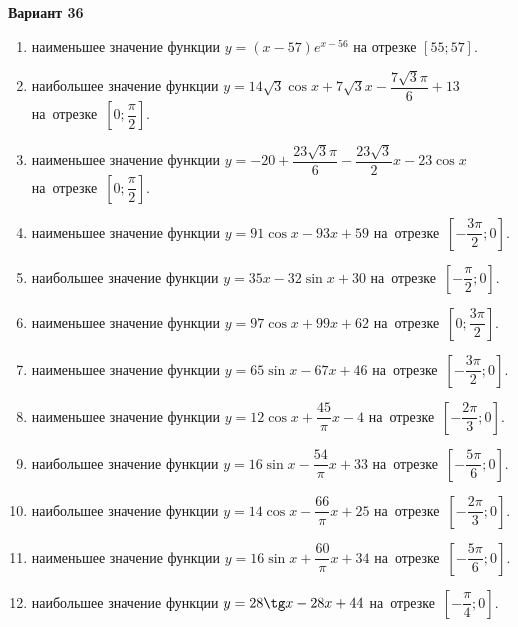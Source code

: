 \documentclass[a4paper,10pt]{article}
\begin{document}
\begin{center}\Large\textbf{Вариант 36}\end{center}

\begin{enumerate}
\item {} наименьшее значение функции $y = \left(x-57\right)e^{x-56}$ на отрезке $\left[55;57\right]$.

\item {} наибольшее значение функции $y = 14\sqrt{3}\cos x+7\sqrt{3}x-\dfrac{7\sqrt{3}\pi}{6} +13$ на~отрезке~$\left[0;\dfrac{\pi }{2}\right]$.

\item {} наименьшее значение функции $y = -20+\dfrac{23\sqrt{3} \pi}{6}-\dfrac{23\sqrt{3}}{2}x-23\cos x$ на~отрезке~$\left[0;\dfrac{\pi }{2}\right]$.

\item {} наименьшее значение функции $y = 91\cos x-93x+59$ на~отрезке~$\left[-\dfrac{3\pi }{2};0\right]$.

\item {} наибольшее значение функции $y = 35x-32\sin x+30$ на~отрезке~$\left[-\dfrac{\pi }{2};0\right]$.

\item {} наименьшее значение функции $y = 97\cos x+99x+62$ на~отрезке~$\left[0;\dfrac{3\pi }{2}\right]$.

\item {} наименьшее значение функции $y = 65\sin x-67x+46$ на~отрезке~$\left[-\dfrac{3\pi }{2};0\right]$.

\item {} наименьшее значение функции $y = 12\cos x+\dfrac{45}{\pi }x -4$ на~отрезке~$\left[-\dfrac{2\pi }{3};0\right]$.

\item {} наибольшее значение функции $y = 16\sin x-\dfrac{54}{\pi }x+33$ на~отрезке~$\left[-\dfrac{5\pi }{6};0\right]$.

\item {} наибольшее значение функции $y = 14\cos x-\dfrac{66}{\pi }x+25$ на~отрезке~$\left[-\dfrac{2\pi }{3};0\right]$.

\item {} наименьшее значение функции $y = 16\sin x+\dfrac{60}{\pi }x+34$ на~отрезке~$\left[-\dfrac{5\pi }{6};0\right]$.

\item {} наибольшее значение функции $y = 28\tg x-28x+44$ на~отрезке~$\left[-\dfrac{\pi }{4};0\right]$.


\end{enumerate}
\end{document}
